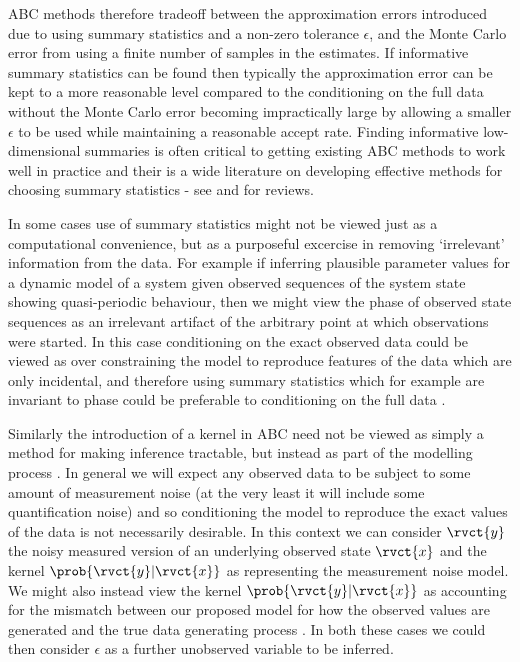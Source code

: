 \ac{ABC} methods therefore tradeoff between the approximation errors introduced due to using summary statistics and a non-zero tolerance $\epsilon$, and the Monte Carlo error from using a finite number of samples in the estimates. If informative summary statistics can be found then typically the approximation error can be kept to a more reasonable level compared to the conditioning on the full data without the Monte Carlo error becoming impractically large by allowing a smaller $\epsilon$ to be used while maintaining a reasonable accept rate. Finding informative low-dimensional summaries is often critical to getting existing \ac{ABC} methods to work well in practice and their is a wide literature on developing effective methods for choosing summary statistics - see \citep{prangle2015summary} and \citep{blum2013comparative} for reviews. 

In some cases use of summary statistics might not be viewed just as a computational convenience, but as a purposeful excercise in removing `irrelevant' information from the data. For example if inferring plausible parameter values for a dynamic model of a system given observed sequences of the system state showing quasi-periodic behaviour, then we might view the phase of observed state sequences as an irrelevant artifact of the arbitrary point at which observations were started. In this case conditioning on the exact observed data could be viewed as over constraining the model to reproduce features of the data which are only incidental, and therefore using summary statistics which for example are invariant to phase could be preferable to conditioning on the full data \citep{wood2010statistical}.

Similarly the introduction of a kernel in \ac{ABC} need not be viewed as simply a method for making inference tractable, but instead as part of the modelling process \citep{wilkinson2013approximate}. In general we will expect any observed data to be subject to some amount of measurement noise (at the very least it will include some quantification noise) and so conditioning the model to reproduce the exact values of the data is not necessarily desirable. In this context we can consider $\rvct{y}$ the noisy measured version of an underlying observed state $\rvct{x}$ and the kernel $\prob{\rvct{y}|\rvct{x}}$ as representing the measurement noise model. We might also instead view the kernel $\prob{\rvct{y}|\rvct{x}}$ as accounting for the mismatch between our proposed model for how the observed values are generated and the true data generating process \citep{ratmann2009model,wilkinson2013approximate}. In both these cases we could then consider $\epsilon$ as a further unobserved variable to be inferred.

